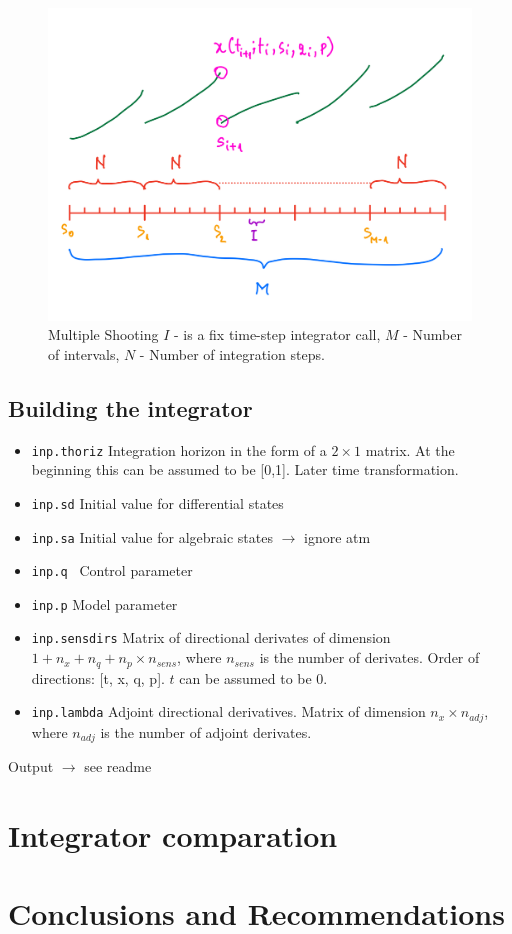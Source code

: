\documentclass[12pt, letterpaper]{article}
\begin{document}
\begin{figure}[h!]
    \centering
    \includegraphics[scale=0.25]{images/multipleShooting.png}
    \caption{Multiple Shooting $I$ - is a fix time-step integrator call, $M$ - Number of intervals, $N$ - Number of integration steps.}
    \label{multipleShootingImg}
\end{figure}



\subsection{Building the integrator}

\begin{itemize}
    \item \texttt{inp.thoriz} Integration horizon in the form of a $2 \times 1$ matrix. At the beginning  this can be assumed to be [0,1]. Later time transformation.
    \item \texttt{inp.sd} Initial value for differential states 
    \item \texttt{inp.sa} Initial value for algebraic states $\rightarrow$ ignore atm
    \item \texttt{inp.q } Control parameter
    \item \texttt{inp.p} Model parameter
    \item \texttt{inp.sensdirs} Matrix of directional derivates of dimension $1+n_x+n_q+n_p \times n_{sens}$, where $n_{sens}$ is the number of derivates.
         Order of directions: [t, x, q, p]. $t$ can be assumed to be 0.
    \item \texttt{inp.lambda} Adjoint directional derivatives. 
           Matrix of dimension $n_x \times n_{adj}$, where $n_{adj}$ is the number of adjoint derivates.
\end{itemize}


Output $\rightarrow$ see readme


\section{Integrator comparation}
\label{Integrator_comparation}


\section{Conclusions and Recommendations}
\label{conclusions_recommandations}








\end{document}
